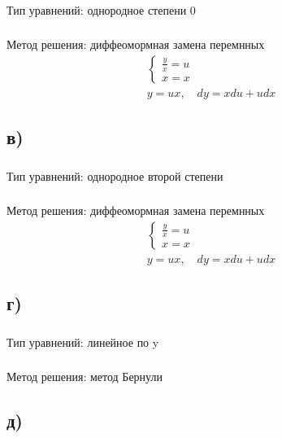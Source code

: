 \documentclass{article}
\begin{document}
\subsubsection*{} 
Тип уравнений: однородное степени 0
\subsubsection*{}
Метод решения: диффеомормная замена перемнных
\begin{gather*}
\begin{cases}
\frac{y}{x}=u \\
x=x
\end{cases}\\
y=ux, \label{pd} \quad   dy=xdu+udx 
\end{gather*}

\subsection*{в)}
\subsubsection*{} 
Тип уравнений: однородное второй степени
\subsubsection*{}
Метод решения: диффеомормная замена перемнных
\begin{gather*}
\begin{cases}
\frac{y}{x}=u \\
x=x
\end{cases}\\
y=ux, \label{pd} \quad   dy=xdu+udx 
\end{gather*}

\subsection*{г)}
\subsubsection*{} 
Тип уравнений: линейное по y

\subsubsection*{}
Метод решения: метод Бернули

\subsection*{д)}
\end{document}
